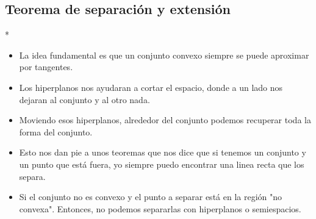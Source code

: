 \begin{paracol}{2}
\section{Teorema de separación y extensión}
\switchcolumn[1]*{\noindent\scriptsize
    \begin{itemize}
	\item La idea fundamental es que un conjunto convexo siempre se puede aproximar por tangentes.
	\item Los hiperplanos nos ayudaran a cortar el espacio, donde a un lado nos dejaran al conjunto y al otro nada.
	\item Moviendo esos hiperplanos, alrededor del conjunto podemos recuperar toda la forma del conjunto.
	\item Esto nos dan pie a unos teoremas que nos dice que si tenemos un conjunto y un punto que está fuera, yo siempre puedo encontrar una linea recta que los separa.
	\item Si el conjunto no es convexo y el punto a separar está en la región "no convexa". Entonces, no podemos separarlas con hiperplanos o semiespacios.
    \end{itemize}
}
\switchcolumn[0]\noindent
\begin{center}
\end{center}

    \begin{center}
    \end{center}


\end{paracol}
